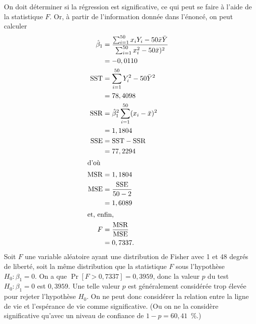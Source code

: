 \begin{solution}{2.14}
    On doit déterminer si la régression est significative, ce qui peut
    se faire à l'aide de la statistique $F$. Or, à partir de
    l'information donnée dans l'énoncé, on peut calculer
    \begin{align*}
      \hat{\beta}_1
      &= \frac{\sum_{i=1}^{50} x_i Y_i - 50 \bar{x} \bar{Y}}{%
        \sum_{i=1}^{50} x_i^2 - 50 \bar{x})^2} \\
      &= -0,0110 \\
      \SST
      &= \sum_{i=1}^{50} Y_i^2 - 50 \bar{Y}^2 \\
      &= 78,4098 \\
      \SSR
      &= \hat{\beta}_1^2 \sum_{i=1}^{50} (x_i - \bar{x})^2 \\
      &= 1,1804 \\
      \SSE
      &= \SST - \SSR \\
      &= 77,2294 \\
      \intertext{d'où}
      \MSR
      &= 1,1804 \\
      \MSE
      &= \frac{\SSE}{50 - 2} \\
      &= 1,6089 \\
      \intertext{et, enfin,}
      F
      &= \frac{\MSR}{\MSE} \\
      &= 0,7337.
    \end{align*}
    Soit $F$ une variable aléatoire ayant une distribution de Fisher
    avec 1 et 48 degrés de liberté, soit la même distribution que la
    statistique $F$ sous l'hypothèse $H_0: \beta_1 = 0$. On a que
    $\Pr[F > 0,7337] = 0,3959$, donc la valeur $p$ du test $H_0:
    \beta_1 = 0$ est $0,3959$. Une telle valeur $p$ est généralement
    considérée trop élevée pour rejeter l'hypothèse $H_0$. On ne peut
    donc considérer la relation entre la ligne de vie et l'espérance
    de vie comme significative. (Ou on ne la considère significative
    qu'avec un niveau de confiance de $1 - p = 60,41$~\%.)
  
\end{solution}
